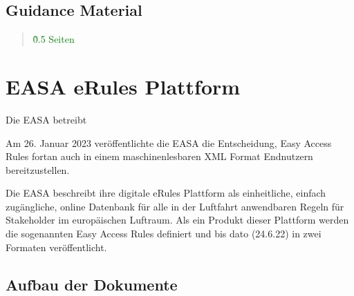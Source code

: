         

\subsection{Guidance Material}

\begin{quote}
\textcolor{green}{\~0.5 Seiten}
\end{quote}
        \pagebreak
    \section{EASA eRules Plattform}

    Die EASA betreibt 

        Am 26. Januar 2023 veröffentlichte die EASA die Entscheidung, Easy Access Rules fortan auch in einem maschinenlesbaren XML Format Endnutzern bereitzustellen. \cite{easa_xml_publication}

    Die EASA beschreibt ihre digitale eRules Plattform als einheitliche, einfach zugängliche, online Datenbank für alle in der Luftfahrt anwendbaren Regeln für Stakeholder im europäischen Luftraum.
    Als ein Produkt dieser Plattform werden die sogenannten Easy Access Rules definiert und bis dato (24.6.22) in zwei Formaten veröffentlicht. 
    \cite{easa_xml_doc}

        
        
        \subsection{Aufbau der Dokumente}

